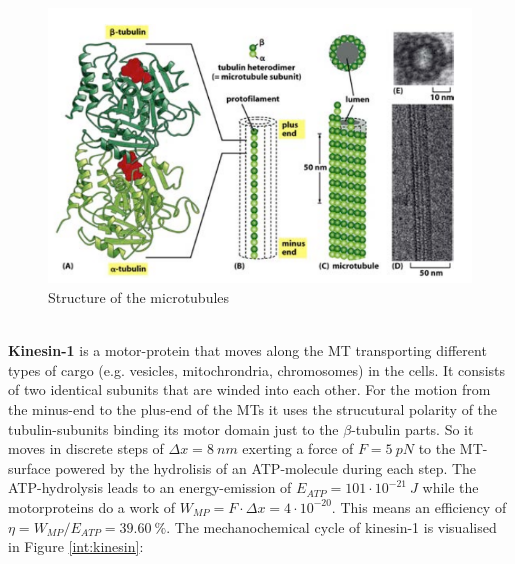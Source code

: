 		\begin{figure}[h]
		 			\centering
		 		   	\captionsetup{justification=raggedright, margin =4cm}            
		 		    	  \includegraphics[scale=0.3]{pic/mt.png}
		 		    \caption{Structure of the microtubules\cite{PA}}
		 		   	\label{int:MT} 
		\end{figure}\\
		\textbf{Kinesin-1} is a motor-protein that moves along the MT transporting different types of cargo (e.g. vesicles, mitochrondria, chromosomes) in the cells. It consists of two identical subunits that are winded into each other. For the motion from the minus-end to the plus-end of the MTs it uses the strucutural polarity of the tubulin-subunits binding its motor domain just to the $\beta$-tubulin parts. So it moves in discrete steps of $\Delta x = 8\  \unit{nm}$ exerting a force of $F = 5\ \unit{pN}$ to the MT-surface powered by the hydrolisis of an ATP-molecule during each step. The ATP-hydrolysis leads to an energy-emission of $E_{ATP} = 101 \cdot 10^{-21}\ \unit{J}$ while the motorproteins do a work of $W_{MP} = F \cdot \Delta x = 4 \cdot 10^{-20}$. This means an efficiency of $\eta = W_{MP} / E_{ATP} = 39.60\ \unit{\%}$. The mechanochemical cycle of kinesin-1 is visualised in Figure \ref{int:kinesin}:
